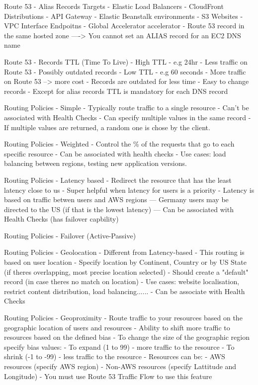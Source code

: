 \documentclass[11pt]{book}
\begin{document}
    Route 53 - Alias Records Targets
    - Elastic Load Balancers
    - CloudFront Distributions
    - API Gateway
    - Elastic Beanstalk environments
    - S3 Websites
    - VPC Interface Endpoitns
    - Global Accelerator accelerator
    - Route 53 record in the same hosted zone
    ----> You cannot set an ALIAS record for an EC2 DNS name

    Route 53 - Records TTL (Time To Live)
    - High TTL - e.g 24hr
        - Less traffic on Route 53
        - Possibly outdated records
    - Low TTL - e.g 60 seconds
        - More traffic on Route 53 --> more cost
        - Records are outdated for less time
        - Easy to change records
    - Except for alias records TTL is mandatory for each DNS record

    Routing Policies - Simple
    - Typically route traffic to a single resource
    - Can't be associated with Health Checks
    - Can specify multiple values in the same record
    - If multiple values are returned, a random one is chose by the client.

    Routing Policies - Weighted
    - Control the \% of the requests that go to each specific resource
    - Can be associated with health checks
    - Use cases: load balancing between regions, testing new application versions.

    Routing Policies - Latency based
    - Redirect the resource that has the least latency close to us
    - Super helpful when latency for users is a priority
    - Latency is based on traffic betwen users and AWS regions
    --- Germany users may be directed to the US (if that is the lowest latency)
    --- Can be associated with Health Checks (has failover capbility)

    Routing Policies - Failover (Active-Passive)

    Routing Policies - Geolocation
    - Different from Latency-based
    - This routing is based on user location
    - Specify location by Continent, Country or by US State (if theres overlapping, most precise location selected)
    - Should create a "default" record (in case theres no match on location)
    - Use cases: website localisation, restrict content distribution, load balancing......
    - Can be associate with Health Checks

    Routing Policies - Geoproximity
    - Route traffic to your resources based on the geographic location of users and resources
    - Ability to shift more traffic to resources based on the defined bias
    - To change the size of the geographic region specify bias values:
        - To expand (1 to 99) - more traffic to the resource
        - To shrink (-1 to -99) - less traffic to the resource
    - Resources can be:
        - AWS resources (specify AWS region)
        - Non-AWS resources (specify Lattitude and Longitude)
    - You must use Route 53 Traffic Flow to use this feature
\end{document}
